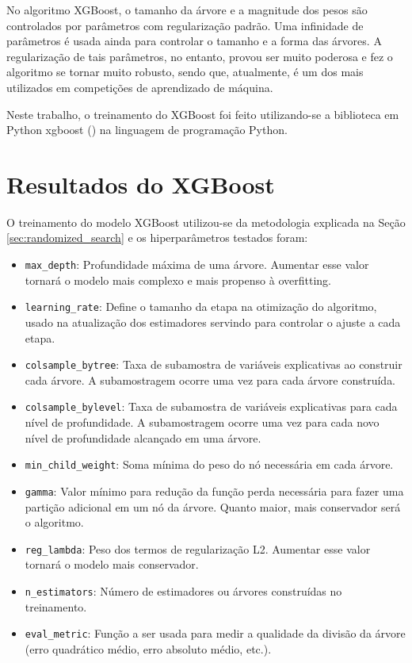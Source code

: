 No algoritmo XGBoost, o tamanho da árvore e a magnitude dos pesos são controlados por parâmetros com regularização padrão. Uma infinidade de parâmetros é usada ainda para controlar o tamanho e a forma das árvores. A regularização de tais parâmetros, no entanto, provou ser muito poderosa e fez o algoritmo se tornar muito robusto, sendo que, atualmente, é um dos mais utilizados em competições de aprendizado de máquina.

Neste trabalho, o treinamento do XGBoost foi feito utilizando-se a biblioteca em Python xgboost (\citet{Xgboost}) na linguagem de programação Python.

\section{Resultados do XGBoost}
\label{sec:resultados_xgboost}

O treinamento do modelo XGBoost utilizou-se da metodologia explicada na Seção \ref{sec:randomized_search} e os hiperparâmetros testados foram:

\begin{itemize}
	\item \verb|max_depth|: Profundidade máxima de uma árvore. Aumentar esse valor tornará o modelo mais complexo e mais propenso à overfitting.
	\item \verb|learning_rate|: Define o tamanho da etapa na otimização do algoritmo, usado na atualização dos estimadores servindo para controlar o ajuste a cada etapa.
	\item \verb|colsample_bytree|: Taxa de subamostra de variáveis explicativas ao construir cada árvore. A subamostragem ocorre uma vez para cada árvore construída.
	\item \verb|colsample_bylevel|: Taxa de subamostra de variáveis explicativas para cada nível de profundidade. A subamostragem ocorre uma vez para cada novo nível de profundidade alcançado em uma árvore.
	\item \verb|min_child_weight|: Soma mínima do peso do nó necessária em cada árvore.
	\item \verb|gamma|: Valor mínimo para redução da função perda necessária para fazer uma partição adicional em um nó da árvore. Quanto maior, mais conservador será o algoritmo.
	\item \verb|reg_lambda|: Peso dos termos de regularização L2. Aumentar esse valor tornará o modelo mais conservador.
	\item \verb|n_estimators|: Número de estimadores ou árvores construídas no treinamento.
	\item \verb|eval_metric|: Função a ser usada para medir a qualidade da divisão da árvore (erro quadrático médio, erro absoluto médio, etc.).
\end{itemize}

